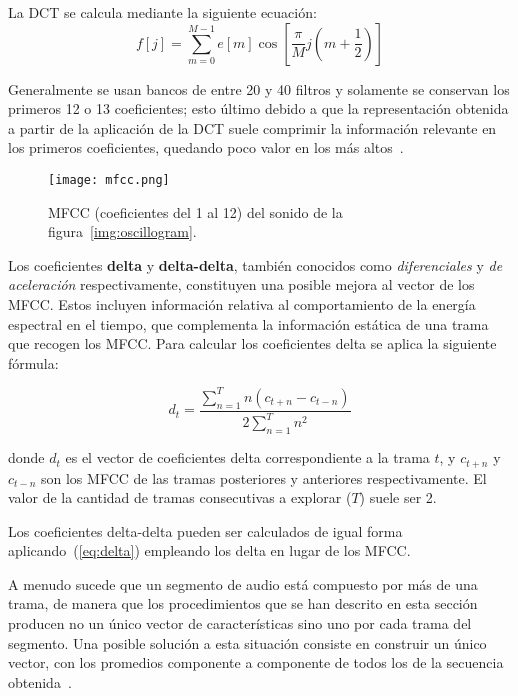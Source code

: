 La DCT se calcula mediante la siguiente ecuación:
\begin{equation}
    \label{eq:DCT}
    f[j] = \sum_{m=0}^{M-1}{e[m]\cos{\left[ \frac{\pi}{M}j\left( m + \frac{1}{2} \right) \right]}}
\end{equation}

Generalmente se usan bancos de entre 20 y 40 filtros y solamente se conservan los primeros 12 o 13 coeficientes;
esto último debido a que la representación obtenida a partir de la aplicación de la DCT suele comprimir la información relevante en los primeros coeficientes, quedando poco valor en los más altos~\cite{Davis80}.

\begin{figure}[!h]
    \centering
    \texttt{[image: mfcc.png]}
    \caption{MFCC (coeficientes del 1 al 12) del sonido de la figura~\ref{img:oscillogram}.}
    \label{img:mfcc}
\end{figure}

Los coeficientes \textbf{delta} y \textbf{delta-delta}, también conocidos como \textit{diferenciales} y \textit{de aceleración} respectivamente,
constituyen una posible mejora al vector de los MFCC\@.
Estos incluyen información relativa al comportamiento de la energía espectral en el tiempo, que complementa la información estática de una trama que recogen los MFCC\@.
Para calcular los coeficientes delta se aplica la siguiente fórmula:

\begin{equation}
    \label{eq:delta}
    d_t = \frac{\sum_{n=1}^{T}{n(c_{t+n} - c_{t-n})}}{2\sum_{n=1}^{T}{n^2}}
\end{equation}

\noindent
donde $d_t$ es el vector de coeficientes delta correspondiente a la trama $t$, y $c_{t+n}$ y $c_{t-n}$ son los MFCC de las tramas posteriores y anteriores respectivamente.
El valor de la cantidad de tramas consecutivas a explorar ($T$) suele ser 2.

Los coeficientes delta-delta pueden ser calculados de igual forma aplicando~(\ref{eq:delta}) empleando los delta en lugar de los MFCC\@.

A menudo sucede que un segmento de audio está compuesto por más de una trama, de manera que los procedimientos que se han descrito en esta sección producen no un único vector de características sino uno por cada trama del segmento.
Una posible solución a esta situación consiste en construir un único vector, con los promedios componente a componente de todos los de la secuencia obtenida~\cite{Fagerlund07,Lee06}.
